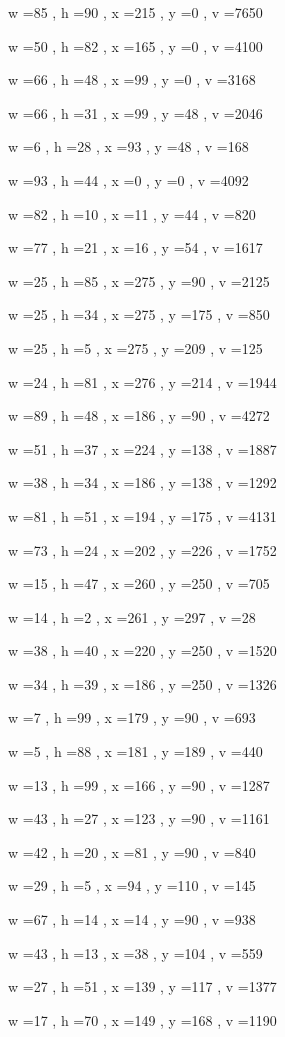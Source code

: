 \documentclass[11pt]{article}
\begin{document}
w =85 , h =90 , x =215 , y =0 , v =7650
\par
w =50 , h =82 , x =165 , y =0 , v =4100
\par
w =66 , h =48 , x =99 , y =0 , v =3168
\par
w =66 , h =31 , x =99 , y =48 , v =2046
\par
w =6 , h =28 , x =93 , y =48 , v =168
\par
w =93 , h =44 , x =0 , y =0 , v =4092
\par
w =82 , h =10 , x =11 , y =44 , v =820
\par
w =77 , h =21 , x =16 , y =54 , v =1617
\par
w =25 , h =85 , x =275 , y =90 , v =2125
\par
w =25 , h =34 , x =275 , y =175 , v =850
\par
w =25 , h =5 , x =275 , y =209 , v =125
\par
w =24 , h =81 , x =276 , y =214 , v =1944
\par
w =89 , h =48 , x =186 , y =90 , v =4272
\par
w =51 , h =37 , x =224 , y =138 , v =1887
\par
w =38 , h =34 , x =186 , y =138 , v =1292
\par
w =81 , h =51 , x =194 , y =175 , v =4131
\par
w =73 , h =24 , x =202 , y =226 , v =1752
\par
w =15 , h =47 , x =260 , y =250 , v =705
\par
w =14 , h =2 , x =261 , y =297 , v =28
\par
w =38 , h =40 , x =220 , y =250 , v =1520
\par
w =34 , h =39 , x =186 , y =250 , v =1326
\par
w =7 , h =99 , x =179 , y =90 , v =693
\par
w =5 , h =88 , x =181 , y =189 , v =440
\par
w =13 , h =99 , x =166 , y =90 , v =1287
\par
w =43 , h =27 , x =123 , y =90 , v =1161
\par
w =42 , h =20 , x =81 , y =90 , v =840
\par
w =29 , h =5 , x =94 , y =110 , v =145
\par
w =67 , h =14 , x =14 , y =90 , v =938
\par
w =43 , h =13 , x =38 , y =104 , v =559
\par
w =27 , h =51 , x =139 , y =117 , v =1377
\par
w =17 , h =70 , x =149 , y =168 , v =1190
\end{document}
